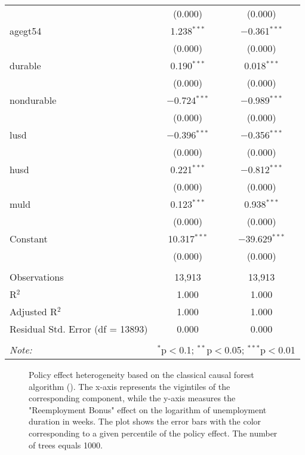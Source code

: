 \documentclass[12pt]{article}
\begin{document}
\begin{table}[H]
{\begin{tabular}{@{\extracolsep{5pt}}lcc}
  & (0.000) & (0.000) \\ 
  agegt54 & 1.238$^{***}$ & $-$0.361$^{***}$ \\ 
  & (0.000) & (0.000) \\ 
  durable & 0.190$^{***}$ & 0.018$^{***}$ \\ 
  & (0.000) & (0.000) \\ 
  nondurable & $-$0.724$^{***}$ & $-$0.989$^{***}$ \\ 
  & (0.000) & (0.000) \\ 
  lusd & $-$0.396$^{***}$ & $-$0.356$^{***}$ \\ 
  & (0.000) & (0.000) \\ 
  husd & 0.221$^{***}$ & $-$0.812$^{***}$ \\ 
  & (0.000) & (0.000) \\ 
  muld & 0.123$^{***}$ & 0.938$^{***}$ \\ 
  & (0.000) & (0.000) \\ 
  Constant & 10.317$^{***}$ & $-$39.629$^{***}$ \\ 
  & (0.000) & (0.000) \\ 
 \hline \\[-1.8ex] 
Observations & 13,913 & 13,913 \\ 
R$^{2}$ & 1.000 & 1.000 \\ 
Adjusted R$^{2}$ & 1.000 & 1.000 \\ 
Residual Std. Error (df = 13893) & 0.000 & 0.000 \\ 
\hline 
\hline \\[-1.8ex] 
\textit{Note:}  & \multicolumn{2}{r}{$^{*}$p$<$0.1; $^{**}$p$<$0.05; $^{***}$p$<$0.01} \\ 
\end{tabular} }
\end{table} 



\begin{figure}[H]
	\centering
    \quad 
	\caption{Policy effect heterogeneity based on the classical causal forest algorithm (\citealp{wager2018estimation}). The x-axis represents the vigintiles of the corresponding component, while the y-axis measures the "Reemployment Bonus" effect on the logarithm of unemployment duration in weeks. The plot shows the error bars with the color corresponding to a given percentile of the policy effect. The number of trees equals 1000. }\label{fig_group_heterogeneity_cf}
\end{figure}
\end{document}
